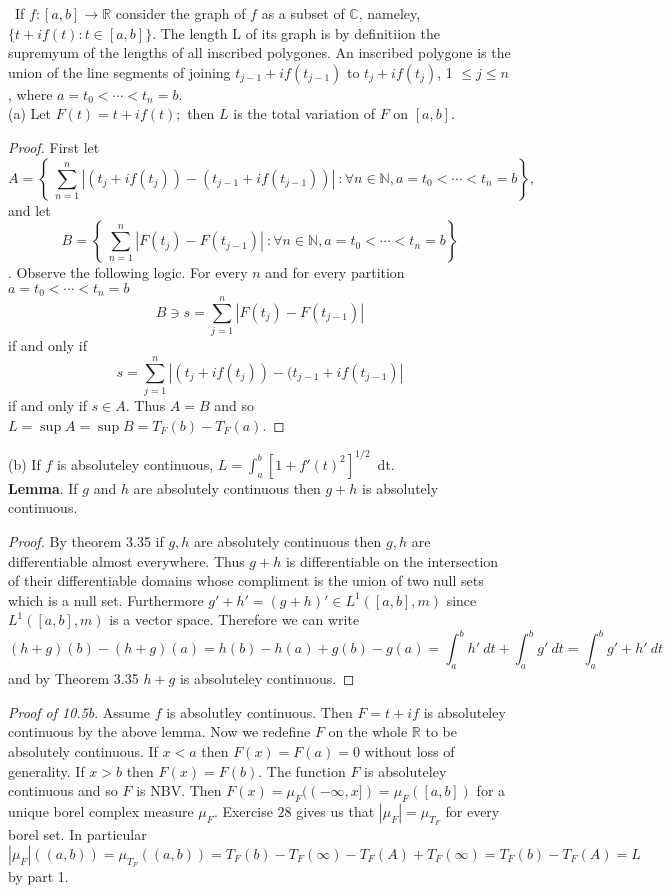 \documentclass[11pt]{amsart}
\theoremstyle{definition}
\numberwithin{theorem}{section}
\numberwithin{definition}{section}
\numberwithin{equation}{section}
\begin{document}
  \medskip {}\ If $f: [a,b] \to \mathbb{R} $ consider the graph of $f$ as a subset of $\mathbb{C}$, nameley, $\{t + if(t): t \in [a,b]\}$. The
  length L of its graph is by definitiion the supremyum of the lengths of all inscribed polygones. An inscribed polygone is the union of the line segments 
  of joining $t_{j-1} + if(t_{j-1})$ to $t_j + if(t_j)$, 1 $\leq j \leq n$, where $a =t_0 < \cdots < t_n = b.$ \\
  (a) Let $F(t) = t + if(t);$ then $L$ is the total variation of $F$ on $[a,b].$
  \begin{proof}
 	First let $$A = \left\{\ \sum_{n=1}^n |(t_j + if(t_j)) - (t_{j-1} + if(t_{j-1}))|\ : \forall n \in \mathbb{N}, a =t_0 < \cdots < t_n = b \right\},$$
 	and let $$B = \left\{\ \sum_{n=1}^n |F(t_j) - F(t_{j-1})|\ : \forall n \in \mathbb{N}, a =t_0 < \cdots < t_n = b \right\}$$. Observe the following logic. For every $n$ and for every  partition $a =t_0 < \cdots < t_n = b$
 	\begin{equation*}
 		B\ni s = \sum_{j=1}^n|F(t_j) - F(t_{j-1})|
 	\end{equation*}
 	if and only if
 	\begin{equation*}
 		 s = \sum_{j=1}^n|(t_j + if(t_j)) - (t_{j-1} + if(t_{j-1})|
 	\end{equation*}
 	if and only if $s \in A$. Thus $A = B$ and so $L=\sup A = \sup B = T_F(b) - T_F(a)$.
  \end{proof}
  (b) If $f$ is absoluteley continuous, $L = \int_a^b [1 + f'(t)^2]^{1/2}$\ dt. \\
	\textbf{Lemma}. If $g$ and $h$ are absolutely continuous then $g + h$ is absolutely continuous.
	\begin{proof}
		By theorem 3.35 if $g,h$ are absolutely continuous then $g,h$ are differentiable almost everywhere. Thus $g +h$ is differentiable on the intersection of their
		differentiable domains whose compliment is the union of two null sets which is a null set. Furthermore $g' + h' = (g+h)' \in L^1([a,b],m)$ since $L^1([a,b],m)$
		is a vector space.  Therefore we can write
		\begin{equation*}
			(h+g)(b) - (h+g)(a) = h(b) - h(a) + g(b) - g(a) = \int_a^b h'\ dt + \int_a^b g'\ dt = \int_a^b g' + h'\ dt 
		\end{equation*}
		and by Theorem 3.35 $h+g$ is absoluteley continuous.
	\end{proof}
	\noindent \emph{Proof of 10.5b}. Assume $f$ is absolutley continuous. Then $F = t + if$ is absoluteley continuous by the above lemma. Now we redefine $F$ on the whole $\mathbb{R}$ to be absolutely continuous. If $x < a$ then $F(x) = F(a) = 0$ without loss of generality. If $x > b$ then $F(x) = F(b).$ The function $F$ is absoluteley continuous and so $F$ is NBV. Then $F(x) = \mu_F((-\infty, x]) = \mu_F([a,b])$ for a unique borel complex measure $\mu_F$. Exercise $28$ gives us that $|\mu_F| = \mu_{T_F}$ for every borel set. In particular $|\mu_F|((a,b)) = \mu_{T_F}((a,b)) = T_F(b) - T_F(\infty) - T_F(A) + T_F(\infty) = T_F(b) - T_F(A) = L$ by part 1.
\end{document}
